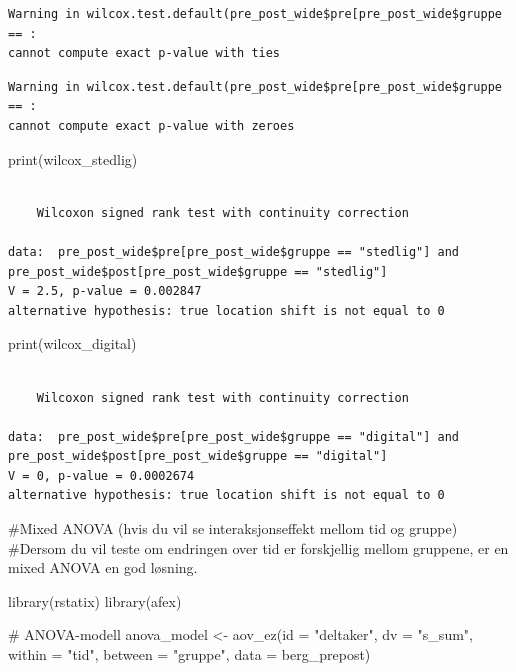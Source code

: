 \documentclass[
  letterpaper,
  DIV=11,
  numbers=noendperiod]{scrreprt}
\newenvironment{Shaded}{\begin{snugshade}}{\end{snugshade}}
\newcommand{\AttributeTok}[1]{\textcolor[rgb]{0.40,0.45,0.13}{#1}}
\newcommand{\CommentTok}[1]{\textcolor[rgb]{0.37,0.37,0.37}{#1}}
\newcommand{\FunctionTok}[1]{\textcolor[rgb]{0.28,0.35,0.67}{#1}}
\newcommand{\NormalTok}[1]{\textcolor[rgb]{0.00,0.23,0.31}{#1}}
\newcommand{\OtherTok}[1]{\textcolor[rgb]{0.00,0.23,0.31}{#1}}
\newcommand{\StringTok}[1]{\textcolor[rgb]{0.13,0.47,0.30}{#1}}
\begin{document}
\begin{verbatim}
Warning in wilcox.test.default(pre_post_wide$pre[pre_post_wide$gruppe == :
cannot compute exact p-value with ties
\end{verbatim}

\begin{verbatim}
Warning in wilcox.test.default(pre_post_wide$pre[pre_post_wide$gruppe == :
cannot compute exact p-value with zeroes
\end{verbatim}

\begin{Shaded}
\begin{Highlighting}[]
\FunctionTok{print}\NormalTok{(wilcox\_stedlig)}
\end{Highlighting}
\end{Shaded}

\begin{verbatim}

    Wilcoxon signed rank test with continuity correction

data:  pre_post_wide$pre[pre_post_wide$gruppe == "stedlig"] and pre_post_wide$post[pre_post_wide$gruppe == "stedlig"]
V = 2.5, p-value = 0.002847
alternative hypothesis: true location shift is not equal to 0
\end{verbatim}

\begin{Shaded}
\begin{Highlighting}[]
\FunctionTok{print}\NormalTok{(wilcox\_digital)}
\end{Highlighting}
\end{Shaded}

\begin{verbatim}

    Wilcoxon signed rank test with continuity correction

data:  pre_post_wide$pre[pre_post_wide$gruppe == "digital"] and pre_post_wide$post[pre_post_wide$gruppe == "digital"]
V = 0, p-value = 0.0002674
alternative hypothesis: true location shift is not equal to 0
\end{verbatim}

\begin{Shaded}
\begin{Highlighting}[]
\CommentTok{\#Mixed ANOVA (hvis du vil se interaksjonseffekt mellom tid og gruppe)}
\CommentTok{\#Dersom du vil teste om endringen over tid er forskjellig mellom gruppene, er en mixed ANOVA en god løsning.}


\FunctionTok{library}\NormalTok{(rstatix)}
\FunctionTok{library}\NormalTok{(afex)}

\CommentTok{\# ANOVA{-}modell}
\NormalTok{anova\_model }\OtherTok{\textless{}{-}} \FunctionTok{aov\_ez}\NormalTok{(}\AttributeTok{id =} \StringTok{"deltaker"}\NormalTok{, }
                      \AttributeTok{dv =} \StringTok{"s\_sum"}\NormalTok{, }
                      \AttributeTok{within =} \StringTok{"tid"}\NormalTok{, }
                      \AttributeTok{between =} \StringTok{"gruppe"}\NormalTok{, }
                      \AttributeTok{data =}\NormalTok{ berg\_prepost)}
\end{Highlighting}
\end{Shaded}
\end{document}
